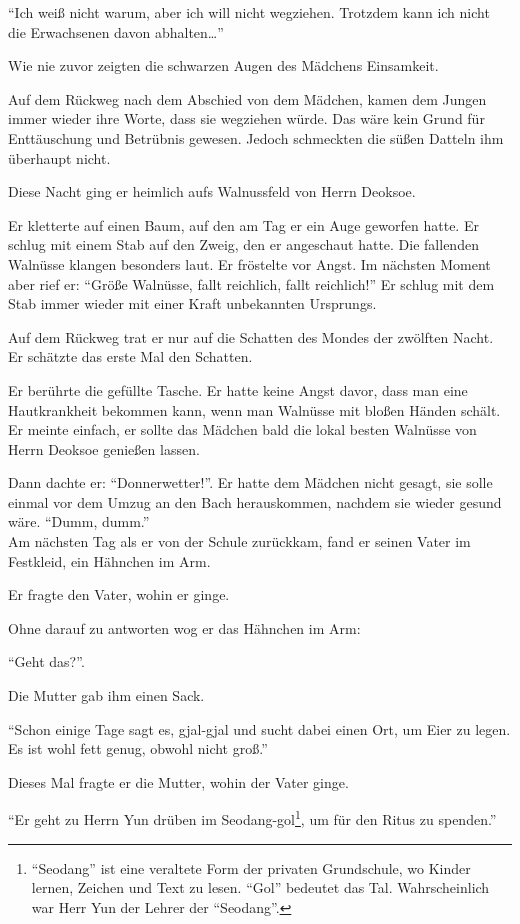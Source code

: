 \documentclass[prd,a4paper,12pt,tightenlines,notitlepage,nofootinbib]{revtex4-1}
\begin{document}
"`Ich weiß nicht warum, aber ich will nicht wegziehen.
Trotzdem kann ich nicht die Erwachsenen davon abhalten\ldots"'

Wie nie zuvor zeigten die schwarzen Augen des Mädchens Einsamkeit.

Auf dem Rückweg nach dem Abschied von dem Mädchen,
kamen dem Jungen immer wieder ihre Worte, dass sie wegziehen würde.
Das wäre kein Grund für Enttäuschung und Betrübnis gewesen.
Jedoch schmeckten die süßen Datteln ihm überhaupt nicht.

Diese Nacht ging er heimlich aufs Walnussfeld von Herrn Deoksoe.

Er kletterte auf einen Baum, auf den am Tag er ein Auge geworfen hatte.
Er schlug mit einem Stab auf den Zweig, den er angeschaut hatte.
Die fallenden Walnüsse klangen besonders laut.
Er fröstelte vor Angst.
Im nächsten Moment aber rief er: "`Größe Walnüsse, fallt reichlich, fallt reichlich!"'
Er schlug mit dem Stab immer wieder mit einer Kraft unbekannten Ursprungs.

Auf dem Rückweg trat er nur auf die Schatten des Mondes der zwölften Nacht.
Er schätzte das erste Mal den Schatten.

Er berührte die gefüllte Tasche.
Er hatte keine Angst davor, dass
man eine Hautkrankheit bekommen kann, wenn
man Walnüsse mit bloßen Händen schält.
Er meinte einfach,
er sollte das Mädchen bald die lokal besten Walnüsse von Herrn Deoksoe
genießen lassen.

Dann dachte er: "`Donnerwetter!"'.
Er hatte dem Mädchen nicht gesagt,
sie solle einmal vor dem Umzug an den Bach herauskommen,
nachdem sie wieder gesund wäre.
"`Dumm, dumm."'
\\

Am nächsten Tag als er von der Schule zurückkam,
fand er seinen Vater im Festkleid, ein Hähnchen im Arm. %

Er fragte den Vater, wohin er ginge.

Ohne darauf zu antworten wog er das Hähnchen im Arm:

"`Geht das?"'.

Die Mutter gab ihm einen Sack.

"`Schon einige Tage sagt es, gjal-gjal
und sucht dabei einen Ort, um Eier zu legen.
Es ist wohl fett genug, obwohl nicht groß."'

Dieses Mal fragte er die Mutter, wohin der Vater ginge.

"`Er geht zu Herrn Yun drüben im Seodang-gol\footnote{
"`Seodang"' ist eine veraltete Form der privaten Grundschule,
wo Kinder lernen,
Zeichen und Text zu lesen.
"`Gol"' bedeutet das Tal.
Wahrscheinlich war Herr Yun der Lehrer der "`Seodang"'.},
um für den Ritus zu spenden."'
\end{document}
